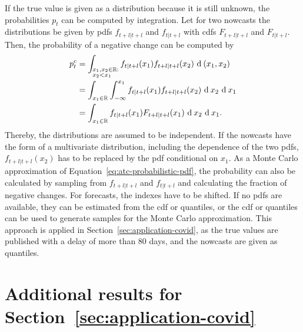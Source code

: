 \documentclass[pdflatex]{sn-jnl}
\theoremstyle{plain}%
\theoremstyle{definition}
\newcommand{\R}{\mathbb{R}}
\newcommand{\pc}{p^c}
\begin{document}
If the true value is given as a distribution because it is still unknown, the probabilities $p_t$ can be computed by integration.
Let for two nowcasts the distributions be given by \acp{pdf} $f_{t+l|t+l}$ and $f_{t|t+l}$ with \acp{cdf}  $F_{t+l|t+l}$ and $F_{t|t+l}$.
Then, the probability of a negative change can be computed by
\begin{align}
    \pc_t
        &= \int_{\begin{subarray}{l}x_1, x_2 \in \R: \\ x_2 < x_1\end{subarray}} f_{t|t+l} (x_1) f_{t+l|t+l} (x_2)  \ \textrm{d} \: (x_1, x_2) \nonumber\\
        &= \int_{x_1 \in \R} \int_{-\infty}^{x_1} f_{t|t+l} (x_1) f_{t+l|t+l} (x_2)  \ \textrm{d} \: x_2 \ \textrm{d} \: x_1 \nonumber\\
        &= \int_{x_1 \in \R} f_{t|t+l} (x_1) F_{t+l|t+l} (x_1)  \ \textrm{d} \: x_2 \ \textrm{d} \: x_1 \label{eq:atc-probabilistic-pdf}.
\end{align}
Thereby, the distributions are assumed to be independent.
If the nowcasts have the form of a multivariate distribution, including the dependence of the two \acp{pdf}, $f_{t+l|t+l} (x_2)$ has to be replaced by the \ac{pdf} conditional on $x_1$.
As a Monte Carlo approximation of Equation~\eqref{eq:atc-probabilistic-pdf}, the probability can also be calculated by sampling from $f_{t+l|t+l}$ and $f_{t|t+l}$ and calculating the fraction of negative changes.
For forecasts, the indexes have to be shifted.
If no \acp{pdf} are available, they can be estimated from the \ac{cdf} or quantiles, or the \ac{cdf} or quantiles can be used to generate samples for the Monte Carlo approximation.
This approach is applied in Section~\ref{sec:application-covid}, as the true values are published with a delay of more than 80 days, and the nowcasts are given as quantiles.


\section{Additional results for Section~\ref{sec:application-covid}}\label{sec:appendix-application-covid}
\end{document}
